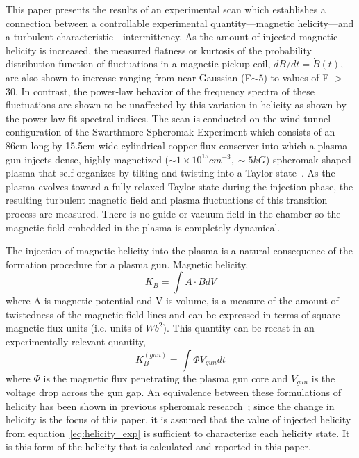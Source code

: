 \documentclass[aps,prl,amsmath,amssymb,reprint,superscriptaddress]{revtex4-1} %
\begin{document}
This paper presents the results of an experimental scan which establishes a connection between a controllable experimental quantity---magnetic helicity---and a turbulent characteristic---intermittency. As the amount of injected magnetic helicity is increased, the measured flatness or kurtosis of the probability distribution function of fluctuations in a magnetic pickup coil, $dB/dt = \dot{B}(t)$, are also shown to increase ranging from near Gaussian (F$\sim 5$) to values of F $>$ 30. In contrast, the power-law behavior of the frequency spectra of these fluctuations are shown to be unaffected by this variation in helicity as shown by the power-law fit spectral indices. The scan is conducted on the wind-tunnel configuration of the Swarthmore Spheromak Experiment which consists of an 86cm long by 15.5cm wide cylindrical copper flux conserver into which a plasma gun injects dense, highly magnetized ($\sim 1\times 10^{15} cm^{-3}, \sim 5kG$) spheromak-shaped plasma that self-organizes by tilting and twisting into a Taylor state~\cite{Gray13,Matthaeus80,Taylor86}. As the plasma evolves toward a fully-relaxed Taylor state during the injection phase, the resulting turbulent magnetic field and plasma fluctuations of this transition process are measured. There is no guide or vacuum field in the chamber so the magnetic field embedded in the plasma is completely dynamical. 

The injection of magnetic helicity into the plasma is a natural consequence of the formation procedure for a plasma gun. Magnetic helicity,
%
\begin{equation}
K_{B} = \int A \cdot B dV
\label{eq:helicity_th}
\end{equation}
%
where A is magnetic potential and V is volume, is a measure of the amount of twistedness of the magnetic field lines and can be expressed in terms of square magnetic flux units (i.e. units of $Wb^{2}$). This quantity can be recast in an experimentally relevant quantity, 
%
\begin{equation}
K_{B}^{(gun)} = \int \Phi V_{gun} dt
\label{eq:helicity_exp}
\end{equation}
%
where $\Phi$ is the magnetic flux penetrating the plasma gun core and $V_{gun}$ is the voltage drop across the gun gap. An equivalence between these formulations of helicity has been shown in previous spheromak research~\cite{barnes86}; since the change in helicity is the focus of this paper, it is assumed that the value of injected helicity from equation~\ref{eq:helicity_exp} is sufficient to characterize each helicity state. It is this form of the helicity that is calculated and reported in this paper.
\end{document}
